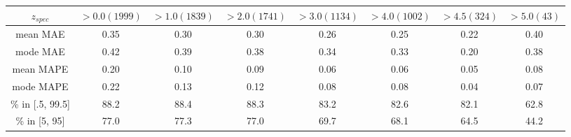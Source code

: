\begin{tabular*}{0.95\textwidth}{cccccccc} 
\hline\abovespace\belowspace 
$z_{spec}$ & $ > 0.0 (1999)$ & $ > 1.0 (1839)$ & $ > 2.0 (1741)$ & $ > 3.0 (1134)$ & $ > 4.0 (1002)$ & $ > 4.5 (324)$ & $ > 5.0 (43)$\\ 
\hline 
\abovespace 
mean MAE & 0.35 & 0.30 & 0.30 & 0.26 & 0.25 & 0.22 & 0.40 \\ 
mode MAE & 0.42 & 0.39 & 0.38 & 0.34 & 0.33 & 0.20 & 0.38 \\ 
mean MAPE & 0.20 & 0.10 & 0.09 & 0.06 & 0.06 & 0.05 & 0.08 \\ 
mode MAPE & 0.22 & 0.13 & 0.12 & 0.08 & 0.08 & 0.04 & 0.07 \\ 
\hline 
\% in [.5, 99.5] & 88.2 & 88.4 & 88.3 & 83.2 & 82.6 & 82.1 & 62.8 \\ 
\% in [5, 95] & 77.0 & 77.3 & 77.0 & 69.7 & 68.1 & 64.5 & 44.2\\ 
 \hline\end{tabular*}